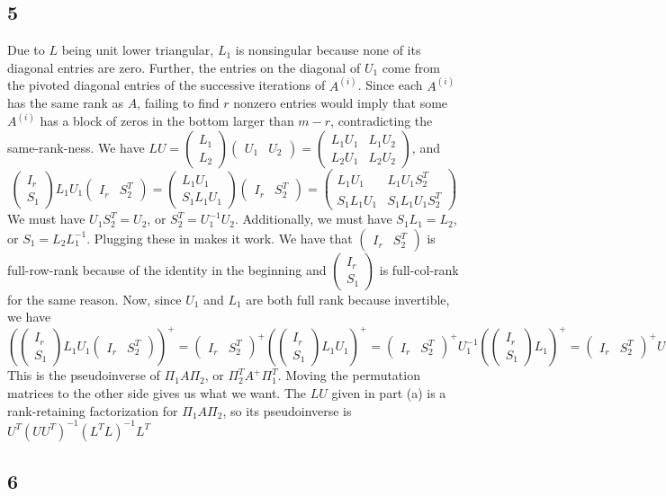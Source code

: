 \documentclass{article}
\newcommand{\openm}{\begin{pmatrix}}
\newcommand{\closem}{\end{pmatrix}}
\begin{document}
\subsection*{5}
Due to $L$ being unit lower triangular, $L_1$ is nonsingular because none of its diagonal entries are zero. Further, the entries on the diagonal of $U_1$ come from the pivoted diagonal entries of the successive iterations of $A^{(i)}$. Since each $A^{(i)}$ has the same rank as $A$, failing to find $r$ nonzero entries would imply that some $A^{(i)}$ has a block of zeros in the bottom larger than $m-r$, contradicting the same-rank-ness.
We have $LU=\openm L_1\\L_2\closem\openm U_1&U_2\closem=\openm L_1U_1&L_1U_2\\L_2U_1&L_2U_2\closem$, and
\[\openm I_r\\S_1\closem L_1U_1\openm I_r&S_2^T\closem=\openm L_1U_1\\S_1L_1U_1\closem\openm I_r&S_2^T\closem=\openm L_1U_1&L_1U_1S_2^T\\S_1L_1U_1&S_1L_1U_1S_2^T\closem\]
We must have $U_1S_2^T=U_2$, or $S_2^T=U_1^{-1}U_2$. Additionally, we must have $S_1L_1=L_2$, or $S_1=L_2L_1^{-1}$. Plugging these in makes it work.
We have that $\openm I_r&S_2^T\closem$ is full-row-rank because of the identity in the beginning and $\openm I_r\\S_1\closem$ is full-col-rank for the same reason. Now, since $U_1$ and $L_1$ are both full rank because invertible, we have 
\[\left(\openm I_r\\S_1\closem L_1U_1\openm I_r&S_2^T\closem\right)^+=\openm I_r&S_2^T\closem^+\left(\openm I_r\\S_1\closem L_1U_1\right)^+=\openm I_r&S_2^T\closem^+U_1^{-1}\left(\openm I_r\\S_1\closem L_1\right)^+=\openm I_r&S_2^T\closem^+U_1^{-1}L_1^{-1}\openm I_r\\S_1\closem^+\]
This is the pseudoinverse of $\Pi_1A\Pi_2$, or $\Pi_2^TA^+\Pi_1^T$. Moving the permutation matrices to the other side gives us what we want.
The $LU$ given in part (a) is a rank-retaining factorization for $\Pi_1A\Pi_2$, so its pseudoinverse is $U^T(UU^T)^{-1}(L^TL)^{-1}L^T$
\subsection*{6}
\end{document}
